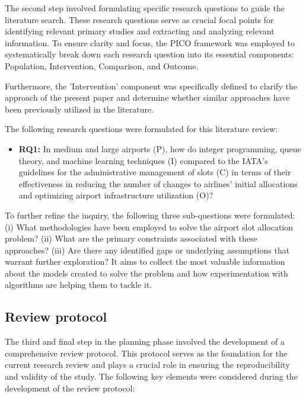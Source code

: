 The second step involved formulating specific research questions to guide the literature search.
%
These research questions serve as crucial focal points for identifying relevant primary studies and extracting and analyzing relevant information.
%
To ensure clarity and focus, the PICO framework was employed to systematically break down each research question into its essential components: Population, Intervention, Comparison, and Outcome.


Furthermore, the 'Intervention' component was specifically defined to clarify the approach of the present paper and determine whether similar approaches have been previously utilized in the literature.


The following research questions were formulated for this literature review:
\begin{itemize}
    \item \textbf{RQ1:} In medium and large airports (P), how do integer programming, queue theory, and machine learning techniques (I)  compared to the \acrshort{IATA}'s guidelines for the administrative management of slots (C) in terms of their effectiveness in reducing the number of changes to airlines' initial allocations and optimizing airport infrastructure utilization (O)?
\end{itemize}


To further refine the inquiry, the following three sub-questions were formulated: (i) What methodologies have been employed to solve the airport slot allocation problem? (ii) What are the primary constraints associated with these approaches? (iii) Are there any identified gaps or underlying assumptions that warrant further exploration? It aims to collect the most valuable information about the models created to solve the problem and how experimentation with algorithms are helping them to tackle it.



\subsection{Review protocol}

The third and final step in the planning phase involved the development of a
comprehensive review protocol.
%
This protocol serves as the foundation for the current research review and plays
a crucial role in ensuring the reproducibility and validity of the study.
%
The following key elements were considered during the development of the review
protocol:


